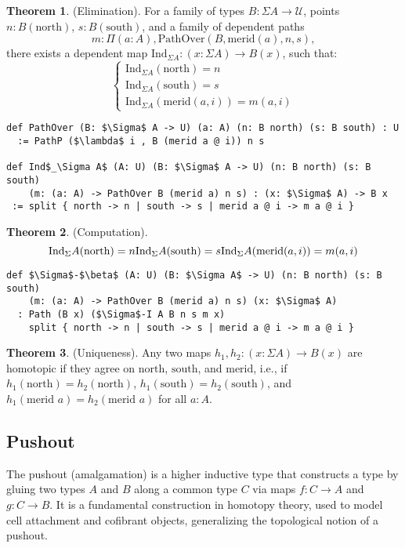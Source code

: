 \documentclass{article}
\theoremstyle{definition}
\newtheorem{theorem}{Theorem}
\begin{document}
\begin{theorem} (Elimination).
For a family of types \( B : \Sigma A \to \mathcal{U} \), points \( n : B(\text{north}) \), \( s : B(\text{south}) \), and a family
of dependent paths
\[
  m : \Pi (a : A), \text{PathOver}(B,\text{merid}(a),n,s),
\]
there exists a dependent map \( \text{Ind}_{\Sigma A} : (x : \Sigma A) \to B(x) \), such that:
\[
\begin{cases}
\text{Ind}_{\Sigma A}(\text{north}) = n \\
\text{Ind}_{\Sigma A}(\text{south}) = s \\
\text{Ind}_{\Sigma A}(\text{merid}(a,i)) = m(a,i)
\end{cases}
\]
\begin{lstlisting}[mathescape=true]
def PathOver (B: $\Sigma$ A -> U) (a: A) (n: B north) (s: B south) : U
  := PathP ($\lambda$ i , B (merid a @ i)) n s

def Ind$_\Sigma A$ (A: U) (B: $\Sigma$ A -> U) (n: B north) (s: B south)
    (m: (a: A) -> PathOver B (merid a) n s) : (x: $\Sigma$ A) -> B x
 := split { north -> n | south -> s | merid a @ i -> m a @ i }
\end{lstlisting}
\end{theorem}

\begin{theorem} (Computation).
\[
    \text{Ind}_\Sigma A(\text{north}) = n \\
    \text{Ind}_\Sigma A(\text{south}) = s \\
    \text{Ind}_\Sigma A(\text{merid}(a,i)) = m(a,i)
\]
\begin{lstlisting}[mathescape=true]
def $\Sigma$-$\beta$ (A: U) (B: $\Sigma A$ -> U) (n: B north) (s: B south)
    (m: (a: A) -> PathOver B (merid a) n s) (x: $\Sigma$ A)
  : Path (B x) ($\Sigma$-I A B n s m x)
    split { north -> n | south -> s | merid a @ i -> m a @ i }
\end{lstlisting}
\end{theorem}

\begin{theorem} (Uniqueness).
Any two maps \( h_1, h_2 : (x : \Sigma A) \to B(x) \) are homotopic if they agree
on \( \text{north} \), \( \text{south} \), and \( \text{merid} \), i.e.,
if \( h_1(\text{north}) = h_2(\text{north}) \), \( h_1(\text{south}) = h_2(\text{south}) \),
and \( h_1(\text{merid } a) = h_2(\text{merid } a) \) for all \( a : A \).
\end{theorem}

\subsection{Pushout}
The pushout (amalgamation) is a higher inductive type that constructs a type by
gluing two types \( A \) and \( B \) along a common type \( C \) via maps \( f : C \to A \)
and \( g : C \to B \). It is a fundamental construction in homotopy theory,
used to model cell attachment and cofibrant objects, generalizing
the topological notion of a pushout.
\end{document}
